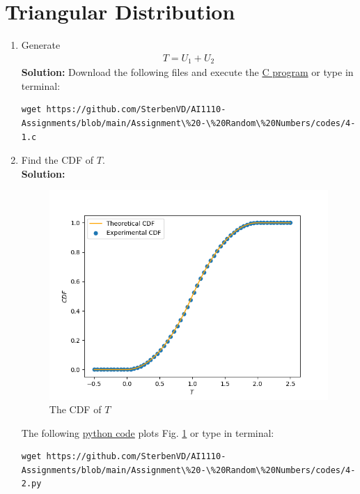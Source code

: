 \documentclass[journal,12pt,twocolumn]{IEEEtran}
\numberwithin{equation}{section}
\renewcommand\thesection{\arabic{section}}
\providecommand{\gitlink}[2]{{\color{blue}\href{https://github.com/SterbenVD/AI1110-Assignments/blob/main/Assignment\%20-\%20Random\%20Numbers/#1}{#2}}}
\newcommand{\solution}{\noindent \textbf{Solution: }}
\begin{document}
\section{Triangular Distribution}
\begin{enumerate}[label=\thesection.\arabic*
        ,ref=\thesection.\theenumi]
    \item Generate
          \begin{align}
              T = U_1+U_2
          \end{align}
          \solution Download the following files and execute the \gitlink{codes/4-1.c}{C program} or type in terminal:
          \begin{lstlisting}
wget https://github.com/SterbenVD/AI1110-Assignments/blob/main/Assignment\%20-\%20Random\%20Numbers/codes/4-1.c
            \end{lstlisting}
    \item Find the CDF of $T$.
          \\
          \solution
          \begin{figure}[H]
              \centering
              \includegraphics[width = \columnwidth]{../figs/4_cdf}
              \caption{The CDF of $T$}
              \label{fig:4_cdf}
          \end{figure}
          The following \gitlink{codes/4-2.py}{python code} plots Fig. \ref{fig:4_cdf} or type in terminal:
          \begin{lstlisting}
wget https://github.com/SterbenVD/AI1110-Assignments/blob/main/Assignment\%20-\%20Random\%20Numbers/codes/4-2.py
            \end{lstlisting}

\end{enumerate}
\end{document}
